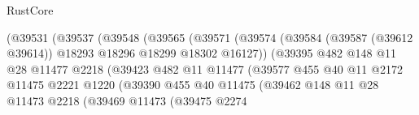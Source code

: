 \begin{lexlean}{RustCore}
\begin{coremodule}
                                    (@39531
                                      (@39537
                                        (@39548
                                          (@39565
                                            (@39571
                                              (@39574
                                                (@39584
                                                  (@39587 (@39612 @39614))
                                                  @18293
                                                  @18296
                                                  @18299
                                                  @18302
                                                  @16127))
                                              (@39395
                                                @482
                                                @148
                                                @11
                                                @28
                                                @11477
                                                @2218
                                                (@39423
                                                  @482
                                                  @11
                                                  @11477
                                                  (@39577
                                                    @455
                                                    @40
                                                    @11
                                                    @2172
                                                    @11475
                                                    @2221
                                                    @1220
                                                    (@39390
                                                      @455
                                                      @40
                                                      @11475
                                                      (@39462
                                                        @148
                                                        @11
                                                        @28
                                                        @11473
                                                        @2218
                                                        (@39469
                                                          @11473
                                                          (@39475
                                                            @2274

\end{coremodule}
\end{lexlean}

